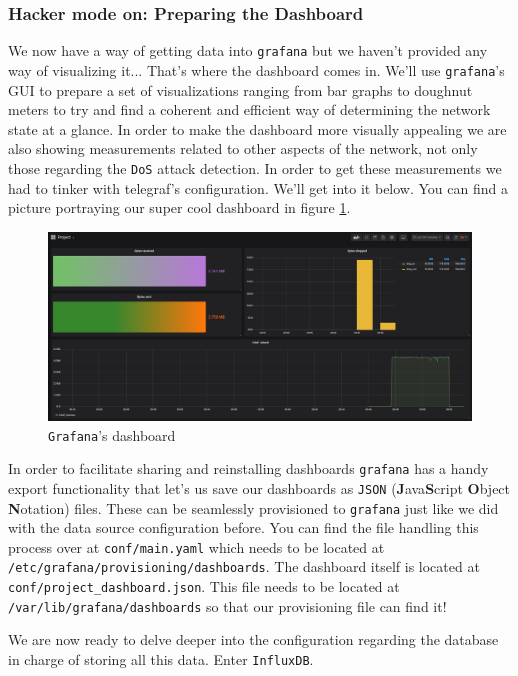 \documentclass[12pt]{article}
\newcommand{\newpar} {
    \vskip 1cm
}
\begin{document}
		\subsubsection{Hacker mode on: Preparing the Dashboard}
			We now have a way of getting data into \texttt{grafana} but we haven't provided any way of visualizing it... That's where the dashboard comes in. We'll use \texttt{grafana}'s GUI to prepare a set of visualizations ranging from bar graphs to doughnut meters to try and find a coherent and efficient way of determining the network state at a glance. In order to make the dashboard more visually appealing we are also showing measurements related to other aspects of the network, not only those regarding the \texttt{DoS} attack detection. In order to get these measurements we had to tinker with telegraf's configuration. We'll get into it below. You can find a picture portraying our super cool dashboard in figure \ref{f:dashboard}.

			\begin{figure}
				\centering
				\includegraphics[width=\linewidth]{dashboard.png}
				\caption{\texttt{Grafana}'s dashboard}
				\label{f:dashboard}
			\end{figure}

			In order to facilitate sharing and reinstalling dashboards \texttt{grafana} has a handy export functionality that let's us save our dashboards as \texttt{JSON} (\textbf{J}ava\textbf{S}cript \textbf{O}bject \textbf{N}otation) files. These can be seamlessly provisioned to \texttt{grafana} just like we did with the data source configuration before. You can find the file handling this process over at \texttt{conf/main.yaml} which needs to be located at \texttt{/etc/grafana/provisioning/dashboards}. The dashboard itself is located at \texttt{conf/project_dashboard.json}. This file needs to be located at \texttt{/var/lib/grafana/dashboards} so that our provisioning file can find it!
			\newpar
			We are now ready to delve deeper into the configuration regarding the database in charge of storing all this data. Enter \texttt{InfluxDB}.
\end{document}
